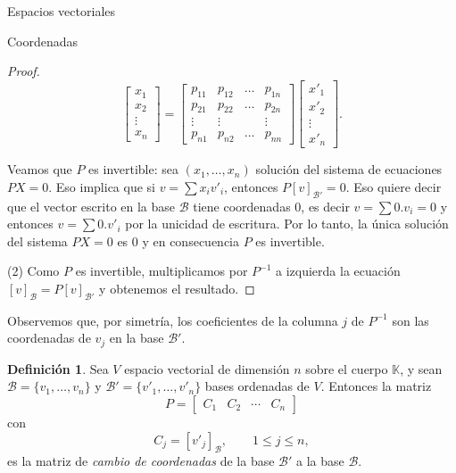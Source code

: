 \documentclass[a4paper,12pt,twoside,spanish,reqno]{amsbook}
\theoremstyle{definition}
\newtheorem{definicion}{Definici\'on}[section]
\theoremstyle{remark}
\newcommand{\K}{\mathbb K}
\begin{document}
\begin{chapter}{Espacios vectoriales}
\begin{section}{Coordenadas}
\begin{proof}
		$$
		\begin{bmatrix}x_1 \\ x_2\\ \vdots \\ x_n\end{bmatrix} = 
		\begin{bmatrix}p_{11} &p_{12} & \ldots & p_{1n} \\p_{21} &p_{22} & \ldots & p_{2n} \\ \vdots &\vdots && \vdots\\ p_{n1} &p_{n2} & \ldots & p_{nn}\end{bmatrix}
		 \begin{bmatrix}x'_1 \\ x'_2\\ \vdots \\ x'_n\end{bmatrix}.
		$$
		
		Veamos que $P$  es invertible: sea $(x_1,\ldots,x_n)$ solución del sistema de ecuaciones $PX =0$. Eso implica que si $v =\sum x_i v'_i$,  entonces $P[v]_{\mathcal B'}=0$.     Eso quiere decir que el vector  escrito en la base $\mathcal B$ tiene coordenadas $0$,  es decir $v = \sum 0. v_i =0$ y entonces $v = \sum 0. v'_i$ por la unicidad de escritura. Por lo tanto, la única solución del sistema $PX=0$ es 0 y en consecuencia $P$  es invertible.
		
		(2)  Como $P$ es invertible, multiplicamos por $P^{-1}$  a izquierda la ecuación $[v]_\mathcal{B} = P[v]_\mathcal{B'}$ y obtenemos el resultado.
	\end{proof}

	Observemos que, por simetría,  los coeficientes de la columna $j$ de $P^{-1}$ son las coordenadas de $v_j$ en la base $\mathcal{B'}$. 
	
	\begin{definicion} 
		Sea $V$  espacio vectorial de dimensión $n$  sobre el cuerpo $\K$, 	y sean $\mathcal{B} = \{v_1,\ldots,v_n\}$ y $\mathcal{B'} = \{v'_1,\ldots,v'_n\}$ bases ordenadas de $V$. Entonces la matriz
		$$
		P = \begin{bmatrix}
		 C_1 &C_2 &\cdots &C_n
		\end{bmatrix}
		$$
		con 
		$$
			C_j = [v'_j]_\mathcal{B},\qquad 1 \le j \le n,
		$$
		es la matriz de \textit{cambio de coordenadas} de la base $\mathcal{B'}$  a la base $\mathcal{B}$.
	\end{definicion}
	

\end{section}
\end{chapter}
\end{document}
